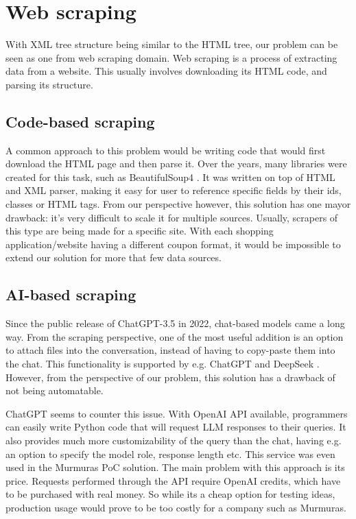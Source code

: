 \documentclass[licencjacka,en]{pracamgr}
\begin{document}
\section{Web scraping}
With XML tree structure being similar to the HTML tree, our problem can be seen as one from web scraping domain. Web scraping \cite{WS} is a process of extracting data from a website. This usually involves downloading its HTML code, and parsing its structure.

\subsection{Code-based scraping}
A common approach to this problem would be writing code that would first download the HTML page and then parse it. Over the years, many libraries were created for this task, such as BeautifulSoup4 \cite{zupa}. It was written on top of HTML and XML parser, making it easy for user to reference specific fields by their ids, classes or HTML tags. From our perspective however, this solution has one mayor drawback: it's very difficult to scale it for multiple sources. Usually, scrapers of this type are being made for a specific site. With each shopping application/website having a different coupon format, it would be impossible to extend our solution for more that few data sources.

\subsection{AI-based scraping}
Since the public release of ChatGPT-3.5 in 2022, chat-based models came a long way. From the scraping perspective, one of the most useful addition is an option to attach files into the conversation, instead of having to copy-paste them into the chat. This functionality is supported by e.g. ChatGPT and DeepSeek \cite{DS}. However, from the perspective of our problem, this solution has a drawback of not being automatable.

ChatGPT seems to counter this issue. With OpenAI API \cite{OAPI} available, programmers can easily write Python code that will request LLM responses to their queries. It also provides much more customizability of the query than the chat, having e.g. an option to specify the model role, response length etc. This service was even used in the Murmuras PoC solution. The main problem with this approach is its price. Requests performed through the API require OpenAI credits, which have to be purchased with real money. So while its a cheap option for testing ideas, production usage would prove to be too costly for a company such as Murmuras.
\end{document}
